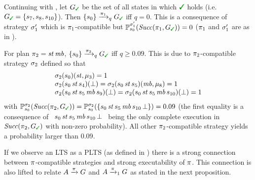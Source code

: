 \begin{example}
  Continuing with , let
  $G_{\goal}$
  be the set of all states in which $\goal$ holds (i.e. $G_{\goal} = \{s_7, s_8, s_{10}\}$).
  Then $\{s_0\}\reach{\plan_1}_qG_{\goal}$ iff $q=0$.  This
  is a consequence of strategy $\sigma'_1$ which is
  $\pi_1$-compatible but
  $\Prob^{\strat'_1}_{s_0}(\Succ(\plan_1,G_{\goal}))=0$ ($\pi_1$ and
  $\sigma'_1$ are as in ).

  For plan $\pi_2 = \mathit{st}\,\mathit{mb}$,
  $\{s_0\}\reach{\plan_2}_qG_{\goal}$ iff $q\geq0.09$.  This is due to
  $\pi_2$-compatible strategy $\sigma_2$ defined so that
  \[
  \begin{array}{l}
    \sigma_2(s_0)(\mathit{st},\mu_3)=1\\
    \sigma_2(s_0\,\mathit{st}\,s_4)(\bot)=
    \sigma_2(s_0\,\mathit{st}\,s_5)(\mathit{mb},\mu_8)=1\\
    \sigma_2(s_0\,\mathit{st}\,s_5\,\mathit{mb}\,s_9)(\bot)=
    \sigma_2(s_0\,\mathit{st}\,s_5\,\mathit{mb}\,s_{10})(\bot)=1
  \end{array}
  \]
  with 
  $\Prob^{\strat_2}_{s_0}(\Succ(\plan_2,G_{\goal}))=\Prob^{\strat_2}_{s_0}(\{s_0\,\stairs\,s_5\,\mobile\,s_{10}\,\complete\})=0.09$
  (the first equality is a consequence of \
  $s_0\,\mathit{st}\,s_5\,\mathit{mb}\,s_{10}\,\bot$ \ being the only
  complete execution in $\Succ(\plan_2,G_{\goal})$ with non-zero
  probability).
  All other $\pi_2$-compatible strategy yields a probability larger
  than $0.09$.
  
\end{example}

If we observe an LTS as a PLTS (as defined in
) there is a strong connection between
$\pi$-compatible strategies and strong executability of $\pi$.
This connection is also lifted to relate $A \xrightarrow{\pi} G$ and $A
\xrightarrow{\pi}_1 G$ as stated in the next proposition.


